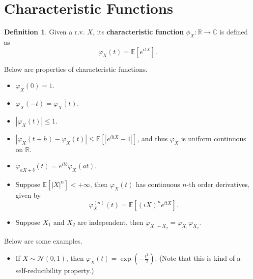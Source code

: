 \documentclass[openany]{book}
\theoremstyle{definition}
\newtheorem{definition}{Definition}[chapter]
\theoremstyle{remark}
\begin{document}
\section{Characteristic Functions}
\begin{definition}
    Given a r.v. $X$, its \textbf{characteristic function} $\phi_X:\mathbb{R}\to \mathbb{C}$ is defined as
    \begin{equation*}
        \varphi_X(t)=\mathbb{E}[e^{itX}].
    \end{equation*}
\end{definition}
Below are properties of characteristic functions.
\begin{itemize}
    \item $\varphi_X(0)=1$.
    \item $\varphi_X(-t)=\overline{\varphi_X(t)}$.
    \item $|\varphi_X(t)|\le1$.
    \item $|\varphi_X(t+h)-\varphi_X(t)|\le \mathbb{E}\left[|e^{ihX}-1|\right]$, and thus $\varphi_X$ is uniform continuous on $\mathbb{R}$.
    \item $\varphi_{aX+b}(t)=e^{itb}\varphi_X(at)$.
    \item Suppose $\mathbb{E}\left[|X|^n\right]<+\infty$, then $\varphi_X(t)$ has continuous $n$-th order derivatives, given by
    \begin{equation*}
        \varphi_X^{(n)}(t)=\mathbb{E}[(iX)^ne^{itX}].
    \end{equation*}
    \item Suppose $X_1$ and $X_2$ are independent, then $\varphi_{X_1+X_2}=\varphi_{X_1}\varphi_{X_2}$.
\end{itemize}
Below are some examples.
\begin{itemize}
    \item If $X\sim \mathcal{N}(0,1)$, then $\varphi_X(t)=\exp\left(-\frac{t^2}{2}\right)$. (Note that this is kind of a self-reducibility property.)
\end{itemize}
\end{document}
